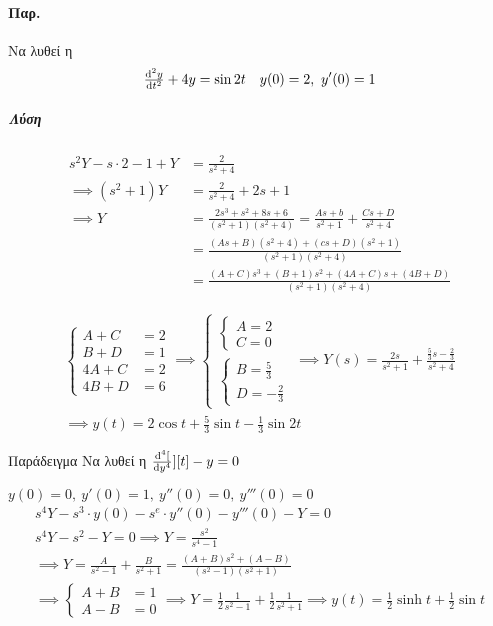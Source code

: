 \documentclass[11pt,a4paper,titlepage,final]{article}
\begin{document}
\paragraph{Παρ.}
Να λυθεί η \[
\od[2]{y}{t}+4y=\sin 2t \quad y(0)=2,\ y'(0)=1
\]
\subparagraph{Λύση}
\begin{align*}
s^2Y-s \cdot 2 -1 + Y &= \frac{2}{s^2+4} \\
\implies (s^2+1)Y &= \frac{2}{s^2+4}+2s+1\\
\implies Y &=\frac{2s^3+s^2+8s+6}{(s^2+1)(s^2+4)} = \frac{As+b}{s^2+1} + \frac{Cs+D}{s^2+4} \\
&= \frac{(As+B)(s^2+4)+(cs+D)(s^2+1)}{(s^2+1)(s^2+4)}
\\ &=
\frac{(A+C)s^3+(B+1)s^2+(4A+C)s+(4B+D)}{(s^2+1)(s^2+4)}
\end{align*}

\begin{align*}
\begin{cases}
A + C &= 2 \\
B + D &= 1 \\
4A + C &= 2 \\
4B + D &= 6
\end{cases} \implies
\begin{cases}
\begin{cases}
A = 2 \\ C = 0
\end{cases} \\
\begin{cases}
B = \frac{5}{3} \\
D = -\frac{2}{3}
\end{cases}
\end{cases} \implies Y(s) = \frac{2s}{s^2+1} + \frac{\frac{5}{3}s-\frac{2}{3}}{s^2+4} \\
\implies \boxed{
	y(t) = 2\cos t + \frac{5}{3}\sin t - \frac{1}{3}\sin 2t
	}
\end{align*}

\begin{exercise*}{Παράδειγμα}
Να λυθεί η \( \od[4][y][t] -y = 0 \)

\( y(0)=0,\ y'(0)=1,\ y''(0)=0,\ y'''(0)=0 \)
\tcblower
\begin{align*}
s^4Y-s^3\cdot y(0)-s^e\cdot y''(0)-y'''(0)-Y = 0 \\
s^4Y -s^2-Y = 0 \implies Y = \frac{s^2}{s^4-1} \\
\implies Y = \frac{A}{s^2-1} + \frac{B}{s^2+1} = \frac{(A+B)s^2+(A-B)}{(s^2-1)(s^2+1)} \\
\implies \begin{cases}
A+B &= 1 \\ A-B &= 0
\end{cases}
\implies Y = \frac{1}{2}\frac{1}{s^2-1}+\frac{1}{2}\frac{1}{s^2+1} \implies y(t) = \frac{1}{2}\sinh t+ \frac{1}{2} \sin t
\end{align*}
\end{exercise*}
\end{document}
